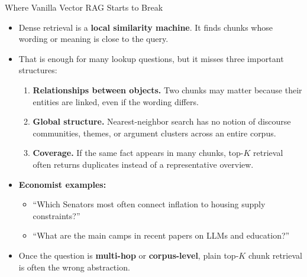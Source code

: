 \documentclass[10pt,english,aspectratio=169]{beamer}
\begin{document}
\begin{frame}{Where Vanilla Vector RAG Starts to Break}
\begin{itemize}
\item Dense retrieval is a \textbf{local similarity machine}. It finds chunks whose wording or meaning is close to the query.

\medskip
\item That is enough for many lookup questions, but it misses three important structures:
\begin{enumerate}
    \item \textbf{Relationships between objects.} Two chunks may matter because their entities are linked, even if the wording differs.
    \item \textbf{Global structure.} Nearest-neighbor search has no notion of discourse communities, themes, or argument clusters across an entire corpus.
    \item \textbf{Coverage.} If the same fact appears in many chunks, top-$K$ retrieval often returns duplicates instead of a representative overview.
\end{enumerate}

\medskip
\item \textbf{Economist examples:}
\begin{itemize}
    \item ``Which Senators most often connect inflation to housing supply constraints?''
    \item ``What are the main camps in recent papers on LLMs and education?''
\end{itemize}

\medskip
\item Once the question is \textbf{multi-hop} or \textbf{corpus-level}, plain top-$K$ chunk retrieval is often the wrong abstraction.
\end{itemize}
\end{frame}
\end{document}
